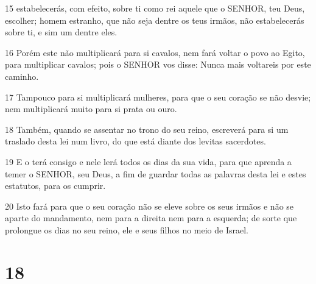 \par 15 estabelecerás, com efeito, sobre ti como rei aquele que o SENHOR, teu Deus, escolher; homem estranho, que não seja dentre os teus irmãos, não estabelecerás sobre ti, e sim um dentre eles.
\par 16 Porém este não multiplicará para si cavalos, nem fará voltar o povo ao Egito, para multiplicar cavalos; pois o SENHOR vos disse: Nunca mais voltareis por este caminho.
\par 17 Tampouco para si multiplicará mulheres, para que o seu coração se não desvie; nem multiplicará muito para si prata ou ouro.
\par 18 Também, quando se assentar no trono do seu reino, escreverá para si um traslado desta lei num livro, do que está diante dos levitas sacerdotes.
\par 19 E o terá consigo e nele lerá todos os dias da sua vida, para que aprenda a temer o SENHOR, seu Deus, a fim de guardar todas as palavras desta lei e estes estatutos, para os cumprir.
\par 20 Isto fará para que o seu coração não se eleve sobre os seus irmãos e não se aparte do mandamento, nem para a direita nem para a esquerda; de sorte que prolongue os dias no seu reino, ele e seus filhos no meio de Israel.

\chapter{18}

